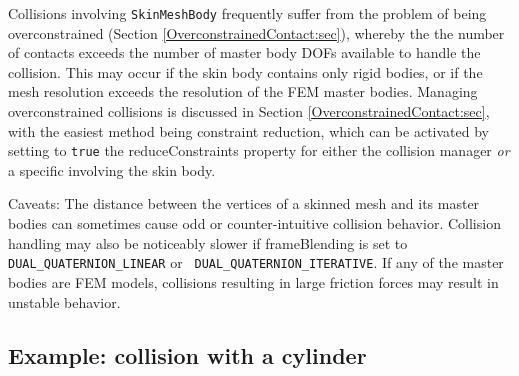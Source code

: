 Collisions involving {\tt SkinMeshBody} frequently suffer from the
problem of being overconstrained (Section
\ref{OverconstrainedContact:sec}), whereby the the number of contacts
exceeds the number of master body DOFs available to handle the
collision. This may occur if the skin body contains only rigid bodies,
or if the mesh resolution exceeds the resolution of the FEM master
bodies. Managing overconstrained collisions is discussed in Section
\ref{OverconstrainedContact:sec}, with the easiest method being
constraint reduction, which can be activated by setting to {\tt true}
the {\sf reduceConstraints} property for either the collision manager
{\it or} a specific
 involving the
skin body.

\begin{sideblock}
Caveats: The distance between the vertices of a skinned mesh and its
master bodies can sometimes cause odd or counter-intuitive collision
behavior. Collision handling may also be noticeably slower if {\sf
frameBlending} is set to {\tt DUAL\_QUATERNION\_LINEAR} or {\tt
DUAL\_QUATERNION\_ITERATIVE}. If any of the master bodies are FEM
models, collisions resulting in large friction forces may result in
unstable behavior.
\end{sideblock}

\subsection{Example: collision with a cylinder}

